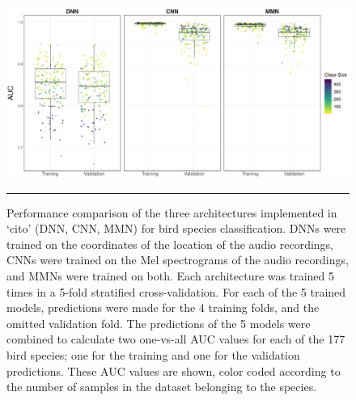 \documentclass[12pt,twoside]{scrreport}
\newcommand{\pkg}[1]{`#1'}
\begin{document}
\begin{figure}[p]
	\includegraphics[width=\textwidth]{../analysis/results/figures/auc_beehive.pdf}
	\caption{Performance comparison of the three architectures implemented in \pkg{cito} (DNN, CNN, MMN) for bird species classification. DNNs were trained on the coordinates of the location of the audio recordings, CNNs were trained on the Mel spectrograms of the audio recordings, and MMNs were trained on both. Each architecture was trained 5 times in a 5-fold stratified cross-validation. For each of the 5 trained models, predictions were made for the 4 training folds, and the omitted validation fold. The predictions of the 5 models were combined to calculate two one-vs-all AUC values for each of the 177 bird species; one for the training and one for the validation predictions. These AUC values are shown, color coded according to the number of samples in the dataset belonging to the species.}
	\label{beehive}
	\rule{\textwidth}{1pt} 
	\newline
	\resizebox{\textwidth}{!}{\usebox{\dnn}}
	\resizebox{\textwidth}{!}{\usebox{\cnn}}
\end{figure}

\newpage


\end{document}
